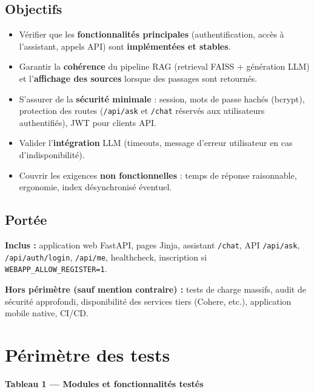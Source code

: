 \documentclass[11pt,a4paper]{article}
\begin{document}
\subsection{Objectifs}
\begin{itemize}[leftmargin=*]
  \item Vérifier que les \textbf{fonctionnalités principales} (authentification, accès à l'assistant, appels API) sont \textbf{implémentées et stables}.
  \item Garantir la \textbf{cohérence} du pipeline RAG (retrieval FAISS + génération LLM) et l'\textbf{affichage des sources} lorsque des passages sont retournés.
  \item S'assurer de la \textbf{sécurité minimale} : session, mots de passe hachés (bcrypt), protection des routes (\texttt{/api/ask} et \texttt{/chat} réservés aux utilisateurs authentifiés), JWT pour clients API.
  \item Valider l'\textbf{intégration} LLM (timeouts, message d'erreur utilisateur en cas d'indisponibilité).
  \item Couvrir les exigences \textbf{non fonctionnelles} : temps de réponse raisonnable, ergonomie, index désynchronisé éventuel.
\end{itemize}

\subsection{Portée}
\textbf{Inclus :} application web FastAPI, pages Jinja, assistant \texttt{/chat}, API \texttt{/api/ask}, \texttt{/api/auth/login}, \texttt{/api/me}, healthcheck, inscription si \texttt{WEBAPP\_ALLOW\_REGISTER=1}.

\textbf{Hors périmètre (sauf mention contraire) :} tests de charge massifs, audit de sécurité approfondi, disponibilité des services tiers (Cohere, etc.), application mobile native, CI/CD.

\section{Périmètre des tests}
\textbf{Tableau 1 — Modules et fonctionnalités testés}
\end{document}
